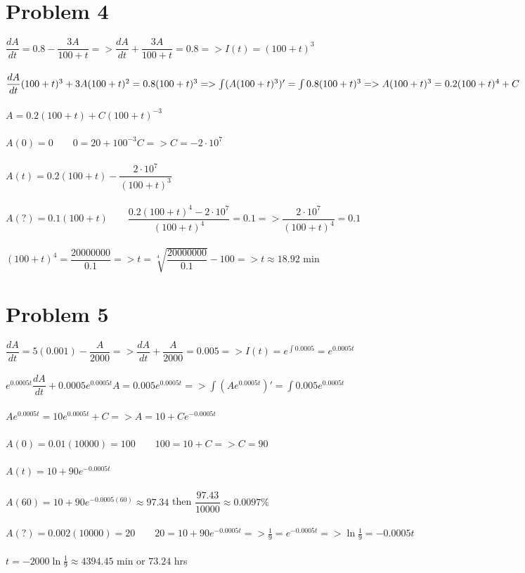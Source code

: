 \documentclass[12pt]{exam}
\begin{document}
\section*{Problem 4}
$\dfrac{dA}{dt}=0.8-\dfrac{3A}{100+t}=>\dfrac{dA}{dt}+\dfrac{3A}{100+t}=0.8=>I(t)=(100+t)^3$\\\\
$\dfrac{dA}{dt}(100+t)^3+3A(100+t)^2=0.8(100+t)^3=>\int(A(100+t)^3)'=\int0.8(100+t)^3=>\\\\A(100+t)^3=0.2(100+t)^4+C$\\\\
$A=0.2(100+t)+C(100+t)^{-3}$\\\\
$A(0)=0\qquad0=20+100^{-3}C=>C=-2\cdot10^7$\\\\
$A(t)=0.2(100+t)-\dfrac{2\cdot10^7}{(100+t)^3}$\\\\
$A(?)=0.1(100+t)\qquad\dfrac{0.2(100+t)^4-2\cdot10^7}{(100+t)^4}=0.1=>\dfrac{2\cdot10^7}{(100+t)^4}=0.1$\\\\
$(100+t)^4=\dfrac{20000000}{0.1}=>t=\sqrt[4]{\dfrac{20000000}{0.1}}-100=>t\approx18.92$ min
\section*{Problem 5}
$\dfrac{dA}{dt}=5(0.001)-\dfrac{A}{2000}=>\dfrac{dA}{dt}+\dfrac{A}{2000}=0.005=>I(t)=e^{\int0.0005}=e^{0.0005t}$\\\\
$e^{0.0005t}\dfrac{dA}{dt}+0.0005e^{0.0005t}A=0.005e^{0.0005t}=>\int(Ae^{0.0005t})'=\int0.005e^{0.0005t}$\\\\
$Ae^{0.0005t}=10e^{0.0005t}+C=>A=10+Ce^{-0.0005t}$\\\\
$A(0)=0.01(10000)=100\qquad100=10+C=>C=90$\\\\
$A(t)=10+90e^{-0.0005t}$\\\\
$A(60)=10+90e^{-0.0005(60)}\approx97.34$ then $\dfrac{97.43}{10000}\approx0.0097\%$\\\\
$A(?)=0.002(10000)=20\qquad20=10+90e^{-0.0005t}=>\frac{1}{9}=e^{-0.0005t}=>\ln{\frac{1}{9}}=-0.0005t$\\\\
$t=-2000\ln{\frac{1}{9}}\approx4394.45$ min or $73.24$ hrs
\end{document}
